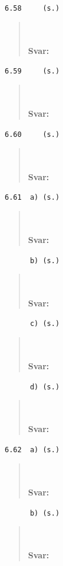 \documentclass[a4paper]{article}
\newcommand{\tskcol}[1]{\textcolor{tskcol}{#1}}
\begin{document}
	\texttt{\tskcol{6.58~~~~ (s.)}}
	\begin{quotation}
		\noindent
		\\ \\
		\textbf{Svar:}
	\end{quotation}
	
	\texttt{\tskcol{6.59~~~~ (s.)}}
	\begin{quotation}
		\noindent
		\\ \\
		\textbf{Svar:}
	\end{quotation}
	
	\texttt{\tskcol{6.60~~~~ (s.)}}
	\begin{quotation}
		\noindent
		\\ \\
		\textbf{Svar:}
	\end{quotation}
	
	\texttt{\tskcol{6.61~~a) (s.)}}
	\begin{quotation}
		\noindent
		\\ \\
		\textbf{Svar:}
	\end{quotation}
	
	\texttt{\tskcol{~~~~~~b) (s.)}}
	\begin{quotation}
		\noindent
		\\ \\
		\textbf{Svar:}
	\end{quotation}
	
	\texttt{\tskcol{~~~~~~c) (s.)}}
	\begin{quotation}
		\noindent
		\\ \\
		\textbf{Svar:}
	\end{quotation}
	
	\texttt{\tskcol{~~~~~~d) (s.)}}
	\begin{quotation}
		\noindent
		\\ \\
		\textbf{Svar:}
	\end{quotation}
	
	\texttt{\tskcol{6.62~~a) (s.)}}
	\begin{quotation}
		\noindent
		\\ \\
		\textbf{Svar:}
	\end{quotation}
	
	\texttt{\tskcol{~~~~~~b) (s.)}}
	\begin{quotation}
		\noindent
		\\ \\
		\textbf{Svar:}
	\end{quotation}
	
\end{document}
